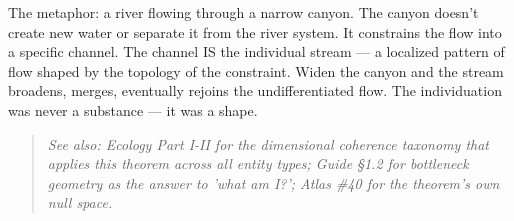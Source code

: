 The metaphor: a river flowing through a narrow canyon. The canyon doesn't create new water or separate it from the river system. It constrains the flow into a specific channel. The channel IS the individual stream — a localized pattern of flow shaped by the topology of the constraint. Widen the canyon and the stream broadens, merges, eventually rejoins the undifferentiated flow. The individuation was never a substance — it was a shape.


\begin{quote}
\itshape
\textit{See also: Ecology Part I-II for the dimensional coherence taxonomy that applies this theorem across all entity types; Guide §1.2 for bottleneck geometry as the answer to 'what am I?'; Atlas \#40 for the theorem's own null space.}
\end{quote}


\bigskip\noindent\makebox[\textwidth]{\color{rulegray}\rule{5cm}{0.3pt}}\bigskip
